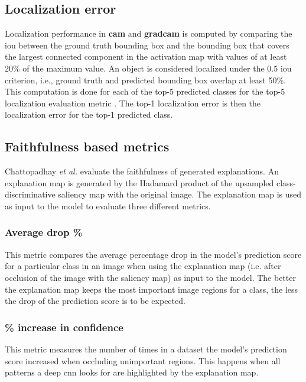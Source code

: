 \subsection{Localization error}
Localization performance in \textbf{\acrshort{cam}} \cite{zhou2016cvpr} and \textbf{\acrshort{gradcam}} \cite{selvaraju2017grad} is computed by comparing the \acrfull{iou} between the ground truth bounding box and the bounding box that covers the largest connected component in the activation map with values of at least 20\% of the maximum value. An object is considered localized under the 0.5 \acrshort{iou} criterion, i.e., ground truth and predicted bounding box overlap at least 50\%. This computation is done for each of the top-5 predicted classes for the top-5 localization evaluation metric \cite{russakovsky2015imagenet}. The top-1 localization error is then the localization error for the top-1 predicted class.

\subsection{Faithfulness based metrics}
Chattopadhay \textit{et al.} \cite{chattopadhay2018grad} evaluate the faithfulness of generated explanations. An explanation map is generated by the Hadamard product \cite{million2007hadamard} of the upsampled class-discriminative saliency map with the original image. The explanation map is used as input to the model to evaluate three different metrics.

\subsubsection{Average drop \%}
This metric compares the average percentage drop in the model's prediction score for a particular class in an image when using the explanation map (i.e. after occlusion of the image with the saliency map) as input to the model. The better the explanation map keeps the most important image regions for a class, the less the drop of the prediction score is to be expected.

\subsubsection{\% increase in confidence}
This metric measures the number of times in a dataset the model's prediction score increased when occluding unimportant regions. This happens when all patterns a deep \acrshort{cnn} looks for are highlighted by the explanation map.

